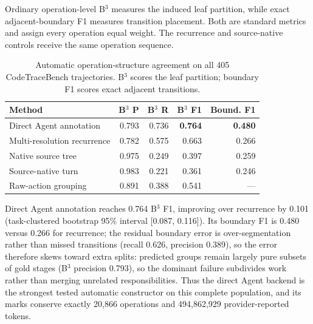 \documentclass[letterpaper]{article}
\begin{document}
Ordinary operation-level B$^3$ measures the induced leaf partition, while exact
adjacent-boundary F1 measures transition placement. Both are standard metrics
and assign every operation equal weight. The recurrence and source-native
controls receive the same operation sequence.

\begin{table}[tb]
\centering\small
\setlength{\tabcolsep}{2.0pt}
\begin{tabular}{@{}lrrrr@{}}
\toprule
Method & B$^3$ P & B$^3$ R & B$^3$ F1 & Bound. F1 \\
\midrule
Direct Agent annotation & 0.793 & 0.736 & \textbf{0.764} & \textbf{0.480} \\
Multi-resolution recurrence & 0.782 & 0.575 & 0.663 & 0.266 \\
Native source tree & 0.975 & 0.249 & 0.397 & 0.259 \\
Source-native turn & 0.983 & 0.221 & 0.361 & 0.246 \\
Raw-action grouping & 0.891 & 0.388 & 0.541 & --- \\
\bottomrule
\end{tabular}
\caption{Automatic operation-structure agreement on all 405 CodeTraceBench
trajectories. B$^3$ scores the leaf partition; boundary F1 scores exact adjacent
transitions.}
\label{tab:rq3-codetrace}
\end{table}

Direct Agent annotation reaches 0.764 B$^3$ F1, improving over recurrence by
0.101 (task-clustered bootstrap 95\% interval [0.087, 0.116]). Its boundary
F1 is 0.480 versus 0.266 for recurrence; the residual boundary error is
over-segmentation rather than missed transitions (recall 0.626, precision
0.389), so the error therefore skews toward extra splits: predicted groups
remain largely pure subsets of gold stages (B$^3$ precision 0.793), so the
dominant failure subdivides work rather than merging unrelated
responsibilities. Thus the direct Agent backend is the
strongest tested automatic constructor on this complete population, and its
marks conserve exactly 20{,}866 operations and 494{,}862{,}929
provider-reported tokens.
\end{document}
